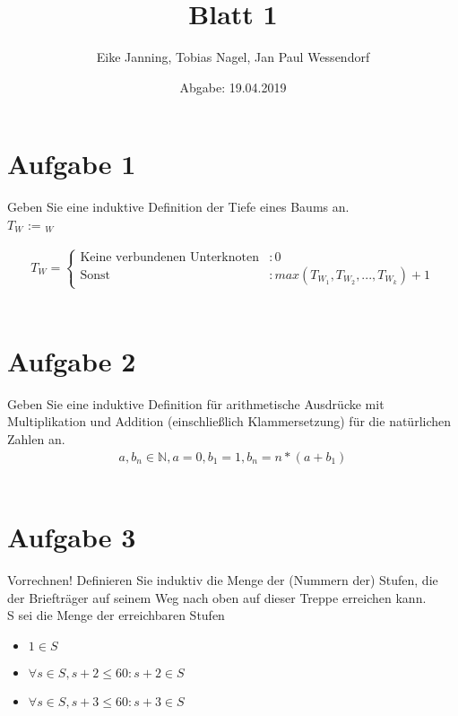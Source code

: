 \documentclass[paper = a4, ngerman]{scrartcl}
\title{Blatt 1}
\author{Eike Janning, Tobias Nagel, Jan Paul Wessendorf}
\date{Abgabe: 19.04.2019}
\begin{document}
\maketitle
\hrulefill

\section*{Aufgabe 1}

Geben Sie eine induktive Definition der Tiefe eines Baums an.\\
$T_W$ :=  $_W$

	\begin{align*}
		T_W =
		\begin{cases}
			\text{Keine verbundenen Unterknoten} &: 0\\
			\text{Sonst} &: max(T_{W_1}, T_{W_2}, ..., T_{W_k}) + 1
		\end{cases}
	\end{align*}\\

\section*{Aufgabe 2}
	 Geben Sie eine induktive Definition für arithmetische Ausdrücke mit Multiplikation und Addition (einschließlich Klammersetzung) für die natürlichen Zahlen an.\\
	 	\begin{align*}
		 	a, b_n \in \mathbb{N}, a = 0, b_1 = 1, b_n = n*(a+b_1)
	 	\end{align*}\\
	 	
\pagebreak

\section*{Aufgabe 3}
Vorrechnen! Definieren Sie induktiv die Menge der (Nummern der) Stufen, die der Briefträger auf seinem Weg nach oben auf dieser Treppe erreichen kann.\\
S sei die Menge der erreichbaren Stufen
\begin{itemize}
	\item $1 \in S$
	\item $\forall s \in S, s+2 \le 60 : s + 2 \in S$
	\item $\forall s \in S, s+3 \le 60 : s + 3 \in S$
\end{itemize}
\end{document}
